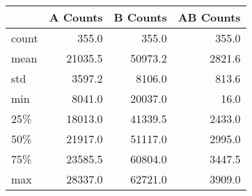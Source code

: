 \begin{tabular}{lrrr}
\toprule
{} &  A Counts &  B Counts &  AB Counts \\
\midrule
count &     355.0 &     355.0 &      355.0 \\
mean  &   21035.5 &   50973.2 &     2821.6 \\
std   &    3597.2 &    8106.0 &      813.6 \\
min   &    8041.0 &   20037.0 &       16.0 \\
25\%   &   18013.0 &   41339.5 &     2433.0 \\
50\%   &   21917.0 &   51117.0 &     2995.0 \\
75\%   &   23585.5 &   60804.0 &     3447.5 \\
max   &   28337.0 &   62721.0 &     3909.0 \\
\bottomrule
\end{tabular}
